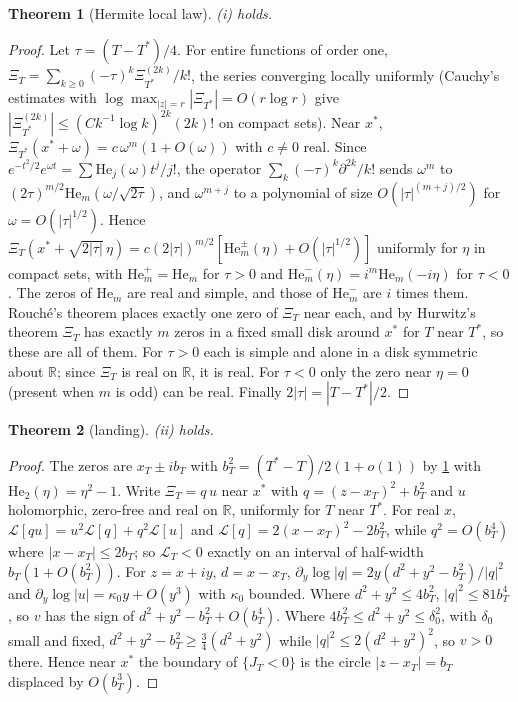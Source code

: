 \documentclass[11pt]{article}
\newtheorem{theorem}{Theorem}[section]
\theoremstyle{definition}\newtheorem{definition}[theorem]{Definition}
\theoremstyle{remark}\newtheorem{remark}[theorem]{Remark}
\newcommand{\R}{\mathbb R}\newcommand{\C}{\mathbb C}\newcommand{\N}{\mathbb N}
\begin{document}
\begin{theorem}[Hermite local law]\label{thm:hermite}
(i) holds.
\end{theorem}
\begin{proof}
Let $\tau=(T-T^*)/4$. For entire functions of order one, $\Xi_T=\sum_{k\ge0}(-\tau)^k\Xi_{T^*}^{(2k)}/k!$, the series converging locally uniformly (Cauchy's estimates with $\log\max_{|z|=r}|\Xi_{T^*}|=O(r\log r)$ give $|\Xi_{T^*}^{(2k)}|\le(Ck^{-1}\log k)^{2k}(2k)!$ on compact sets). Near $x^*$, $\Xi_{T^*}(x^*+\omega)=c\,\omega^m(1+O(\omega))$ with $c\ne0$ real. Since $e^{-t^2/2}e^{\omega t}=\sum\mathrm{He}_j(\omega)t^j/j!$, the operator $\sum_k(-\tau)^k\partial^{2k}/k!$ sends $\omega^m$ to $(2\tau)^{m/2}\mathrm{He}_m(\omega/\sqrt{2\tau})$, and $\omega^{m+j}$ to a polynomial of size $O(|\tau|^{(m+j)/2})$ for $\omega=O(|\tau|^{1/2})$. Hence $\Xi_T(x^*+\sqrt{2|\tau|}\,\eta)=c(2|\tau|)^{m/2}[\mathrm{He}_m^\pm(\eta)+O(|\tau|^{1/2})]$ uniformly for $\eta$ in compact sets, with $\mathrm{He}_m^+=\mathrm{He}_m$ for $\tau>0$ and $\mathrm{He}_m^-(\eta)=i^m\mathrm{He}_m(-i\eta)$ for $\tau<0$. The zeros of $\mathrm{He}_m$ are real and simple, and those of $\mathrm{He}_m^-$ are $i$ times them. Rouch\'e's theorem places exactly one zero of $\Xi_T$ near each, and by Hurwitz's theorem $\Xi_T$ has exactly $m$ zeros in a fixed small disk around $x^*$ for $T$ near $T^*$, so these are all of them. For $\tau>0$ each is simple and alone in a disk symmetric about $\R$; since $\Xi_T$ is real on $\R$, it is real. For $\tau<0$ only the zero near $\eta=0$ (present when $m$ is odd) can be real. Finally $2|\tau|=|T-T^*|/2$.
\end{proof}

\begin{theorem}[landing]\label{thm:landing}
(ii) holds.
\end{theorem}
\begin{proof}
The zeros are $x_T\pm ib_T$ with $b_T^2=(T^*-T)/2(1+o(1))$ by \cref{thm:hermite} with $\mathrm{He}_2(\eta)=\eta^2-1$. Write $\Xi_T=q\,u$ near $x^*$ with $q=(z-x_T)^2+b_T^2$ and $u$ holomorphic, zero-free and real on $\R$, uniformly for $T$ near $T^*$. For real $x$, $\mathcal L[qu]=u^2\mathcal L[q]+q^2\mathcal L[u]$ and $\mathcal L[q]=2(x-x_T)^2-2b_T^2$, while $q^2=O(b_T^4)$ where $|x-x_T|\le2b_T$; so $\mathcal L_T<0$ exactly on an interval of half-width $b_T(1+O(b_T^2))$. For $z=x+iy$, $d=x-x_T$, $\partial_y\log|q|=2y(d^2+y^2-b_T^2)/|q|^2$ and $\partial_y\log|u|=\kappa_0y+O(y^3)$ with $\kappa_0$ bounded. Where $d^2+y^2\le4b_T^2$, $|q|^2\le81b_T^4$, so $v$ has the sign of $d^2+y^2-b_T^2+O(b_T^4)$. Where $4b_T^2\le d^2+y^2\le\delta_0^2$, with $\delta_0$ small and fixed, $d^2+y^2-b_T^2\ge\frac34(d^2+y^2)$ while $|q|^2\le2(d^2+y^2)^2$, so $v>0$ there. Hence near $x^*$ the boundary of $\{J_T<0\}$ is the circle $|z-x_T|=b_T$ displaced by $O(b_T^3)$.
\end{proof}
\end{document}
